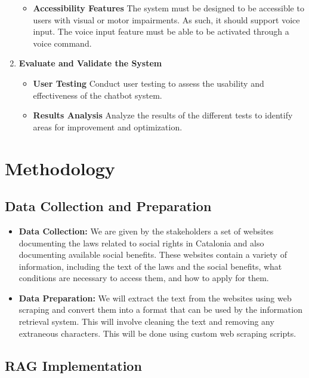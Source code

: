 \documentclass[a4paper,12pt,twoside]{ThesisStyle}
\begin{document}
\begin{enumerate}
\begin{itemize}
          \item \textbf{Accessibility Features} The system must be designed to be accessible to users with visual or motor impairments. As such, it should support voice input. The voice input feature must be able to be activated through a voice command.
        \end{itemize}
  \item \textbf{Evaluate and Validate the System}
        \begin{itemize}
          \item \textbf{User Testing} Conduct user testing to assess the usability and effectiveness of the chatbot system.
          \item \textbf{Results Analysis} Analyze the results of the different tests to identify areas for improvement and optimization.
        \end{itemize}
\end{enumerate}

\section{Methodology}

\subsection{Data Collection and Preparation}
\label{subsec:data}

\begin{itemize}
  \item \textbf{Data Collection:} We are given by the stakeholders a set of websites documenting the laws related to social rights in Catalonia and also documenting available social benefits. These websites contain a variety of information, including the text of the laws and the social benefits, what conditions are necessary to access them, and how to apply for them.
  \item \textbf{Data Preparation:} We will extract the text from the websites using web scraping and convert them into a format that can be used by the information retrieval system. This will involve cleaning the text and removing any extraneous characters. This will be done using custom web scraping scripts.
\end{itemize}

\subsection{RAG Implementation}
\label{subsec:rag-implementation}
\end{document}
